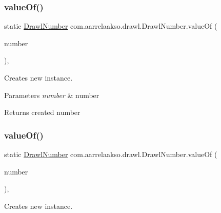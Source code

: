 \subsubsection{\texorpdfstring{value\+Of()}{valueOf()}\hspace{0.1cm}{\footnotesize\ttfamily [2/4]}}
{\footnotesize\ttfamily static \hyperlink{classcom_1_1aarrelaakso_1_1drawl_1_1_drawl_number}{Drawl\+Number} com.\+aarrelaakso.\+drawl.\+Drawl\+Number.\+value\+Of (\begin{DoxyParamCaption}\item[{double}]{number }\end{DoxyParamCaption})\hspace{0.3cm}{\ttfamily [static]}, {\ttfamily [protected]}}



Creates new instance. 


\begin{DoxyParams}{Parameters}
{\em number} & number \\
\hline
\end{DoxyParams}
\begin{DoxyReturn}{Returns}
created number 
\end{DoxyReturn}
\mbox{\label{classcom_1_1aarrelaakso_1_1drawl_1_1_drawl_number_a21c0497d95b85494f35c4378445ae778}} 
\subsubsection{\texorpdfstring{value\+Of()}{valueOf()}\hspace{0.1cm}{\footnotesize\ttfamily [3/4]}}
{\footnotesize\ttfamily static \hyperlink{classcom_1_1aarrelaakso_1_1drawl_1_1_drawl_number}{Drawl\+Number} com.\+aarrelaakso.\+drawl.\+Drawl\+Number.\+value\+Of (\begin{DoxyParamCaption}\item[{@Not\+Null Big\+Decimal}]{number }\end{DoxyParamCaption})\hspace{0.3cm}{\ttfamily [static]}, {\ttfamily [protected]}}



Creates new instance. 


